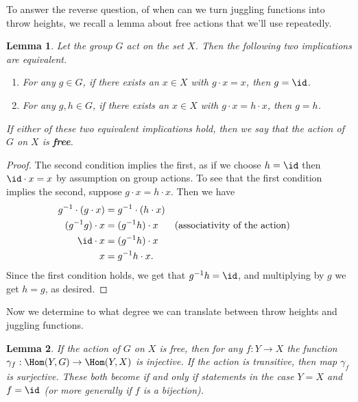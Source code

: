 \documentclass[12nt]{article}
\theoremstyle{plain}
\newtheorem{lemma}{Lemma}
\begin{document}
To answer the reverse question, of when can we turn juggling functions into throw heights, we recall a lemma about free actions that we'll use repeatedly.

\begin{lemma}
Let the group $G$ act on the set $X$. Then the following two implications are equivalent.
\begin{enumerate}
\item
For any $g \in G$, if there exists an $x \in X$ with $g \cdot x = x$, then $g = \id$.
\item
For any $g, h \in G$, if there exists an $x \in X$ with $g \cdot x = h \cdot x$, then $g = h$.
\end{enumerate}
If either of these two equivalent implications hold, then we say that the action of $G$ on $X$ is \textbf{free}.
\end{lemma}

\begin{proof}
The second condition implies the first, as if we choose $h = \id$ then $\id \cdot x = x$ by assumption on group actions. To see that the first condition implies the second, suppose $g \cdot x = h \cdot x$. Then we have 
\begin{align*}
g^{-1} \cdot (g \cdot x) &= g^{-1} \cdot (h \cdot x) \\
(g^{-1}g) \cdot x &= (g^{-1}h) \cdot x && \text{(associativity of the action)} \\
\id \cdot x &= (g^{-1}h) \cdot x \\
x &= g^{-1}h \cdot x.
\end{align*}
Since the first condition holds, we get that $g^{-1}h = \id$, and multiplying by $g$ we get $h = g$, as desired.
\end{proof}

Now we determine to what degree we can translate between throw heights and juggling functions.

\begin{lemma}
If the action of $G$ on $X$ is free, then for any $f : Y \to X$ the function $\gamma_f : \Hom(Y, G) \to \Hom(Y, X)$ is injective. If the action is transitive, then map $\gamma_f$ is surjective. These both become if and only if statements in the case $Y = X$ and $f = \id$ (or more generally if $f$ is a bijection).
\end{lemma}
\end{document}
